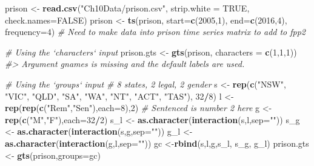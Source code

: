 \documentclass[]{book}
\newenvironment{Shaded}{\begin{snugshade}}{\end{snugshade}}
\newcommand{\CommentTok}[1]{\textcolor[rgb]{0.56,0.35,0.01}{\textit{#1}}}
\newcommand{\DataTypeTok}[1]{\textcolor[rgb]{0.13,0.29,0.53}{#1}}
\newcommand{\DecValTok}[1]{\textcolor[rgb]{0.00,0.00,0.81}{#1}}
\newcommand{\KeywordTok}[1]{\textcolor[rgb]{0.13,0.29,0.53}{\textbf{#1}}}
\newcommand{\NormalTok}[1]{#1}
\newcommand{\OperatorTok}[1]{\textcolor[rgb]{0.81,0.36,0.00}{\textbf{#1}}}
\newcommand{\OtherTok}[1]{\textcolor[rgb]{0.56,0.35,0.01}{#1}}
\newcommand{\StringTok}[1]{\textcolor[rgb]{0.31,0.60,0.02}{#1}}
\begin{document}
\begin{Shaded}
\begin{Highlighting}[]
\NormalTok{prison <-}\StringTok{ }\KeywordTok{read.csv}\NormalTok{(}\StringTok{"Ch10Data/prison.csv"}\NormalTok{, }\DataTypeTok{strip.white =} \OtherTok{TRUE}\NormalTok{, }\DataTypeTok{check.names=}\OtherTok{FALSE}\NormalTok{)}
\NormalTok{prison <-}\StringTok{ }\KeywordTok{ts}\NormalTok{(prison, }\DataTypeTok{start=}\KeywordTok{c}\NormalTok{(}\DecValTok{2005}\NormalTok{,}\DecValTok{1}\NormalTok{), }\DataTypeTok{end=}\KeywordTok{c}\NormalTok{(}\DecValTok{2016}\NormalTok{,}\DecValTok{4}\NormalTok{), }\DataTypeTok{frequency=}\DecValTok{4}\NormalTok{)}
\CommentTok{# Need to make data into prison time series matrix to add to fpp2}

\CommentTok{# Using the `characters` input}
\NormalTok{prison.gts <-}\StringTok{ }\KeywordTok{gts}\NormalTok{(prison, }\DataTypeTok{characters =} \KeywordTok{c}\NormalTok{(}\DecValTok{1}\NormalTok{,}\DecValTok{1}\NormalTok{,}\DecValTok{1}\NormalTok{))}
\CommentTok{#> Argument gnames is missing and the default labels are used.}

\CommentTok{# Using the `groups` input # 8 states, 2 legal, 2 gender}
\NormalTok{s <-}\StringTok{ }\KeywordTok{rep}\NormalTok{(}\KeywordTok{c}\NormalTok{(}\StringTok{"NSW"}\NormalTok{, }\StringTok{"VIC"}\NormalTok{, }\StringTok{"QLD"}\NormalTok{, }\StringTok{"SA"}\NormalTok{, }\StringTok{"WA"}\NormalTok{, }\StringTok{"NT"}\NormalTok{, }\StringTok{"ACT"}\NormalTok{, }\StringTok{"TAS"}\NormalTok{), }\DecValTok{32}\OperatorTok{/}\DecValTok{8}\NormalTok{)}
\NormalTok{l <-}\StringTok{ }\KeywordTok{rep}\NormalTok{(}\KeywordTok{rep}\NormalTok{(}\KeywordTok{c}\NormalTok{(}\StringTok{"Rem"}\NormalTok{,}\StringTok{"Sen"}\NormalTok{),}\DataTypeTok{each=}\DecValTok{8}\NormalTok{),}\DecValTok{2}\NormalTok{) }\CommentTok{# Sentenced is number 2 here}
\NormalTok{g <-}\StringTok{ }\KeywordTok{rep}\NormalTok{(}\KeywordTok{c}\NormalTok{(}\StringTok{"M"}\NormalTok{,}\StringTok{"F"}\NormalTok{),}\DataTypeTok{each=}\DecValTok{32}\OperatorTok{/}\DecValTok{2}\NormalTok{)}
\NormalTok{s_l <-}\StringTok{ }\KeywordTok{as.character}\NormalTok{(}\KeywordTok{interaction}\NormalTok{(s,l,}\DataTypeTok{sep=}\StringTok{""}\NormalTok{))}
\NormalTok{s_g <-}\StringTok{ }\KeywordTok{as.character}\NormalTok{(}\KeywordTok{interaction}\NormalTok{(s,g,}\DataTypeTok{sep=}\StringTok{""}\NormalTok{))}
\NormalTok{g_l <-}\StringTok{ }\KeywordTok{as.character}\NormalTok{(}\KeywordTok{interaction}\NormalTok{(g,l,}\DataTypeTok{sep=}\StringTok{""}\NormalTok{))}
\NormalTok{gc <-}\KeywordTok{rbind}\NormalTok{(s,l,g,s_l, s_g, g_l)}
\NormalTok{prison.gts <-}\StringTok{ }\KeywordTok{gts}\NormalTok{(prison,}\DataTypeTok{groups=}\NormalTok{gc)}
\end{Highlighting}
\end{Shaded}
\end{document}
